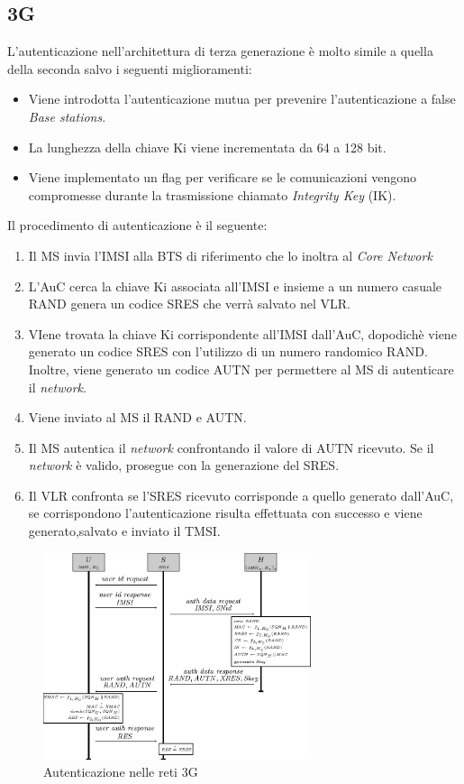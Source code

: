 \subsection{3G}
L'autenticazione nell'architettura di terza generazione è molto simile a quella della seconda salvo i seguenti miglioramenti:
\begin{itemize}
    \item Viene introdotta l'autenticazione mutua per prevenire l'autenticazione a false \textit{Base stations}.
    \item La lunghezza della chiave Ki viene incrementata da 64 a 128 bit.
    \item Viene implementato un flag per verificare se le comunicazioni vengono compromesse durante la trasmissione chiamato \textit{Integrity Key} (IK).
\end{itemize}
Il procedimento di autenticazione è il seguente\cite{4g-auth}:
\begin{enumerate}
    \item Il MS invia l'IMSI alla BTS di riferimento che lo inoltra al \textit{Core Network}
    \item L'AuC cerca la chiave Ki associata all'IMSI e insieme a un numero casuale RAND genera un codice SRES che verrà
    salvato nel VLR.
    \item VIene trovata la chiave Ki corrispondente all'IMSI dall'AuC, dopodichè viene generato un codice SRES con l'utilizzo di un numero randomico RAND.
    Inoltre, viene generato un codice AUTN per permettere al MS di autenticare il \textit{network}.
    \item Viene inviato al MS il RAND e AUTN.
    \item Il MS autentica il \textit{network} confrontando il valore di AUTN ricevuto. Se il \textit{network} è valido, prosegue con la generazione del SRES.
    \item Il VLR confronta se l'SRES ricevuto corrisponde a quello generato dall'AuC, se corrispondono l'autenticazione risulta
    effettuata con successo e viene generato,salvato e inviato il TMSI.
\end{enumerate}
\begin{figure}[h]
    \centering
    \includegraphics[width=0.7\textwidth]{images/auth-3g.png}
    \caption{Autenticazione nelle reti 3G}
\end{figure}

